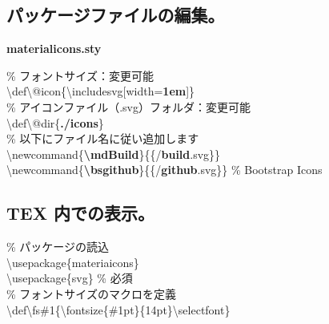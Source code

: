 \documentclass[a5j,10pt]{ltjarticle}
\def\fs#1{\fontsize{#1pt}{14pt}\selectfont}
\begin{document}
\subsection{パッケージファイルの編集。}
\textbf{materialicons.sty}\\  
{\fs{8}
\hspace{4mm}\% フォントサイズ：変更可能\vspace{1mm}\\
\hspace{4mm}\textbackslash def\textbackslash @icon\{\textbackslash includesvg[width=\textbf{1em}]\}\vspace{2mm}\\
\hspace{4mm}\% アイコンファイル（.svg）フォルダ：変更可能\vspace{1mm}\\
\hspace{4mm}\textbackslash def\textbackslash @dir\{\textbf{./icons}\}\vspace{2mm}\\
\hspace{4mm}\% 以下にファイル名に従い追加します\vspace{1mm}\\
\hspace{4mm}\textbackslash newcommand\{\textcolor{code}{\textbf{\textbackslash mdBuild}}\}\{\textbackslash@icon\{\textbackslash@dir/\textcolor{code}{\textbf{build}}.svg\}\}\\
\hspace{4mm}\textbackslash newcommand\{\textcolor{code}{\textbf{\textbackslash bsgithub}}\}\{\textbackslash@icon\{\textbackslash@dir/\textcolor{code}{\textbf{github}}.svg\}\} \% Bootstrap Icons

}


\subsection{TEX 内での表示。}
\% パッケージの読込\\
\hspace{4mm}\textbackslash usepackage\{materiaicons\}\\
\hspace{4mm}\textbackslash usepackage\{svg\} \% 必須\\

\% フォントサイズのマクロを定義\\
\hspace{4mm}\textbackslash def\textbackslash fs\#1\{\textbackslash fontsize\{\#1pt\}\{14pt\}\textbackslash selectfont\}
  
\end{document}
